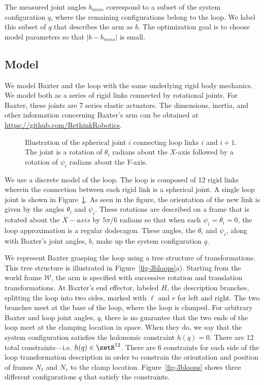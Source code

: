 \documentclass[letterpaper, 10pt, conference]{ieeeconf}
\begin{document}
The measured joint angles $b_{meas}$ correspond to a subset of the system configuration $q$, where the remaining configurations belong to the loop.  We label this subset of $q$ that describes the arm as $b$.  The optimization goal is to choose model parameters so that $|b-b_{meas}|$ is small.

\subsection{Model}
We model Baxter and the loop with the same underlying rigid body mechanics.  We model both as a series of rigid links connected by rotational joints.  For Baxter, these joints are 7 series elastic actuators.  The dimensions,  inertia, and other information concerning Baxter's arm can be obtained at \url{https://github.com/RethinkRobotics}.  

\begin{figure}
\centering
\def\svgwidth{.97\textwidth}%

\caption{Illustration of the spherical joint $i$ connecting loop links $i$ and $i+1$.  The joint is a rotation of $\theta_i$ radians about the $X$-axis followed by a rotation of $\psi_i$ radians about the $Y$-axis. }
\label{fig-loop_link}
\end{figure}

We use a discrete model of the loop.  The loop is composed of 12 rigid links wherein the connection between each rigid link is a spherical joint.  A single loop joint is shown in Figure~\ref{fig-loop_link}.  As seen in the figure, the orientation of the new link is given by the angles $\theta_i$ and $\psi_i$.  These rotations are described on a frame that is rotated about the $X-axis$ by $5\pi/6$ radians so that when each $\psi_i = \theta_i = 0$, the loop approximation is a regular dodecagon.  These angles, the $\theta_i$ and $\psi_i$, along with Baxter's joint angles, $b$, make up the system configuration $q$.  

We represent Baxter grasping the loop using a tree structure of transformations.  This tree structure is illustrated in Figure~\ref{fig-3bloops}a).  Starting from the world frame $\mathcal{W}$, the arm is specified with successive rotation and translation transformations.  At Baxter's end effector, labeled $H$, the description branches, splitting the loop into two sides, marked with $\ell$ and $r$ for left and right.  The two branches meet at the base of the loop, where the loop is clamped.  For arbitrary Baxter and loop joint angles, $q$, there is no guarantee that the two ends of the loop meet at the clamping location in space.  When they do, we say that the system configuration satisfies the holonomic constraint $h(q) = 0$.  There are 12 total constraints---i.e. $h(q)\in\setR^{12}$.  There are 6 constraints for each side of the loop transformation description in order to constrain the orientation and position of frames $N_\ell$ and $N_r$ to the clamp location.  Figure~\ref{fig-3bloops} shows three different configurations $q$ that satisfy the constraints.
\end{document}
